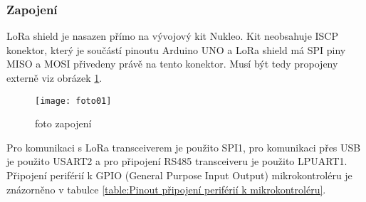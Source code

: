 



\subsubsection{Zapojení}
LoRa shield \cite{draginoWiki} je nasazen přímo na vývojový kit Nukleo. Kit neobsahuje ISCP konektor, který je součástí pinoutu Arduino UNO a LoRa shield má SPI piny MISO a MOSI přivedeny právě na tento konektor. Musí být tedy propojeny externě viz obrázek \ref{fig:03}. 

\begin{figure}[!h]
    \centering
    \texttt{[image: foto01]}
    \caption{foto zapojení}
    \label{fig:03}
\end{figure}

Pro komunikaci s LoRa transceiverem je použito SPI1, pro komunikaci přes USB je použito USART2 a pro připojení RS485 transceiveru je použito LPUART1. 
Připojení periférií k GPIO (General Purpose Input Output) mikrokontroléru je znázorněno v tabulce \ref{table:Pinout připojení periférií k mikrokontroléru}.

